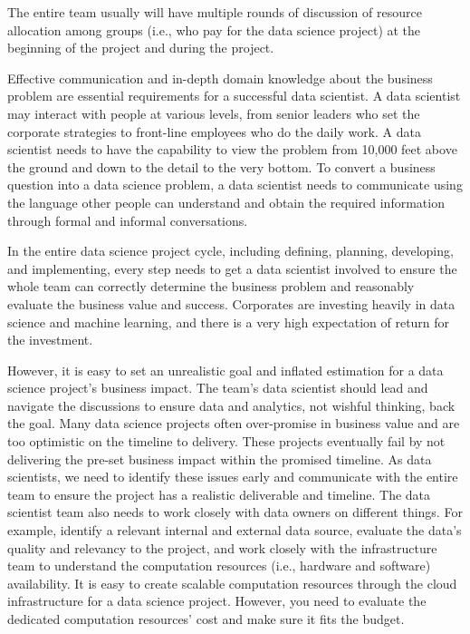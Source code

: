 \documentclass[
  12pt,
]{krantz}
\begin{document}
The entire team usually will have multiple rounds of discussion of resource allocation among groups (i.e., who pay for the data science project) at the beginning of the project and during the project.

Effective communication and in-depth domain knowledge about the business problem are essential requirements for a successful data scientist. A data scientist may interact with people at various levels, from senior leaders who set the corporate strategies to front-line employees who do the daily work. A data scientist needs to have the capability to view the problem from 10,000 feet above the ground and down to the detail to the very bottom. To convert a business question into a data science problem, a data scientist needs to communicate using the language other people can understand and obtain the required information through formal and informal conversations.

In the entire data science project cycle, including defining, planning, developing, and implementing, every step needs to get a data scientist involved to ensure the whole team can correctly determine the business problem and reasonably evaluate the business value and success. Corporates are investing heavily in data science and machine learning, and there is a very high expectation of return for the investment.

However, it is easy to set an unrealistic goal and inflated estimation for a data science project's business impact. The team's data scientist should lead and navigate the discussions to ensure data and analytics, not wishful thinking, back the goal. Many data science projects often over-promise in business value and are too optimistic on the timeline to delivery. These projects eventually fail by not delivering the pre-set business impact within the promised timeline. As data scientists, we need to identify these issues early and communicate with the entire team to ensure the project has a realistic deliverable and timeline. The data scientist team also needs to work closely with data owners on different things. For example, identify a relevant internal and external data source, evaluate the data's quality and relevancy to the project, and work closely with the infrastructure team to understand the computation resources (i.e., hardware and software) availability. It is easy to create scalable computation resources through the cloud infrastructure for a data science project. However, you need to evaluate the dedicated computation resources' cost and make sure it fits the budget.
\end{document}
